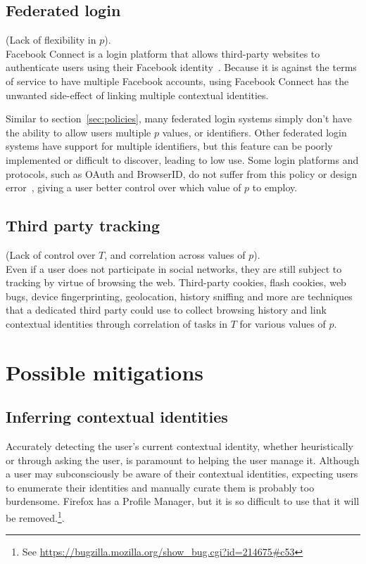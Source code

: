 \documentclass{llncs}
\begin{document}
\subsection{Federated login}
\label{sec:login}
(Lack of flexibility in $p$).\\
Facebook Connect is a login platform that allows third-party websites to
authenticate users using their Facebook identity~\cite{fb_connect}. Because it
is against the terms of service to have multiple Facebook accounts, using
Facebook Connect has the unwanted side-effect of linking multiple contextual
identities.

Similar to section~\ref{sec:policies}, many federated login systems simply
don't have the ability to allow users multiple $p$ values, or identifiers.
Other federated login systems have support for multiple identifiers, but
this feature can be poorly implemented or difficult to discover, leading to
low use.
Some login platforms and protocols, such as OAuth and BrowserID,
do not suffer from this policy or design error~\cite{browserid,oauth},
giving a user better control over which value of $p$ to employ.

\subsection{Third party tracking}
\label{sec:tracking}
(Lack of control over $T$, and correlation across values of $p$).\\
Even if a user does not participate in social networks, they are still subject
to tracking by virtue of browsing the web. Third-party cookies, flash cookies,
web bugs, device fingerprinting, geolocation, history sniffing and more are
techniques that a dedicated third party could use to collect browsing history
and link contextual identities through correlation of tasks in $T$ for various
values of $p$.

\section{Possible mitigations}

\subsection{Inferring contextual identities}
Accurately detecting the user's current contextual identity, whether
heuristically or through asking the user, is paramount to helping the user
manage it.
Although a user may subconsciously be aware of their contextual identities,
expecting users to enumerate their identities and manually curate them is
probably too burdensome. Firefox has a Profile Manager, but it is so difficult to use that it will be removed.\footnote{See \url{https://bugzilla.mozilla.org/show\_bug.cgi?id=214675\#c53}}.
\end{document}
